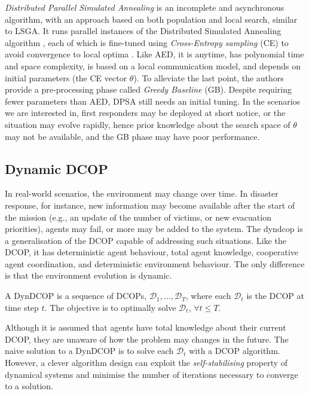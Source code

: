 \emph{Distributed Parallel Simulated Annealing} \cite{mahmud2020b} is an incomplete and
asynchronous algorithm, with an approach based on both population and local search,
similar to LSGA. It runs parallel instances of the Distributed Simulated Annealing
algorithm \cite{arshad2004dsan}, each of which is fine-tuned using
\emph{Cross-Entropy sampling} (CE) \cite[Section $9.7.3$]{kroese2013} to avoid convergence
to local optima \cite{zivan2014}. Like AED, it is anytime, has polynomial time and space
complexity, is based on a local communication model, and depends on initial parameters
(the CE vector $\theta$). To alleviate the last point, the authors provide a
pre-processing phase called \emph{Greedy Baseline} (GB). Despite requiring fewer
parameters than AED, DPSA still needs an initial tuning. In the scenarios we are
interested in, first responders may be deployed at short notice, or the situation may
evolve rapidly, hence prior knowledge about the search space of $\theta$ may not be
available, and the GB phase may have poor performance.

\subsection{Dynamic DCOP}\label{sec:lit-dyndcop}

In real-world scenarios, the environment may change over time. In disaster response, for
instance, new information may become available after the start of the mission (e.g., an
update of the number of victims, or new evacuation priorities), agents may fail, or more
may be added to the system. The \gls{dyndcop} is a generalisation of the DCOP capable of
addressing such situations. Like the DCOP, it has deterministic agent behaviour, total
agent knowledge, cooperative agent coordination, and deterministic environment behaviour.
The only difference is that the environment evolution is dynamic.

\begin{definition}\label{def:dyndcop}
    A DynDCOP is a sequence of DCOPs, $\mathcal{D}_1, \dots, \mathcal{D}_T$, where each
    $\mathcal{D}_t$ is the DCOP at time step $t$. The objective is to optimally solve
    $\mathcal{D}_t$, $\forall t \leq T$.
\end{definition}

Although it is assumed that agents have total knowledge about their current DCOP, they are
unaware of how the problem may changes in the future. The naive solution to a DynDCOP is
to solve each $\mathcal{D}_t$ with a DCOP algorithm. However, a clever algorithm design
can exploit the \emph{self-stabilising} property of dynamical systems \cite{schneider1993}
and minimise the number of iterations necessary to converge to a solution.


